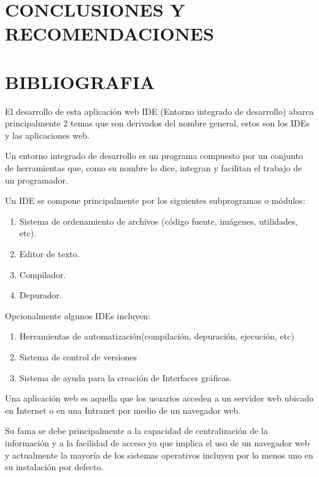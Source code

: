 \documentclass[12pt,letterpaper,oneside]{article}
\begin{document}
\section{CONCLUSIONES Y RECOMENDACIONES}

\section{BIBLIOGRAFIA}


El desarrollo de esta aplicación web IDE (Entorno integrado de
desarrollo) abarca principalmente 2 temas que son derivados del nombre
general, estos son los IDEs y las aplicaciones web.

Un entorno integrado de desarrollo es un programa
compuesto por un conjunto de herramientas que, como su nombre lo dice,
integran y facilitan el trabajo de un programador.

Un IDE se compone principalmente por los siguientes subprogramas o
módulos:

\begin{enumerate}
\item Sistema de ordenamiento de archivos (código fuente, imágenes, utilidades, etc).
\item Editor de texto.
\item Compilador.
\item Depurador.
\end{enumerate}

Opcionalmente algunos IDEs incluyen:


\begin{enumerate}
\item Herramientas de automatización(compilación, depuración, ejecución, etc)
\item Sistema de control de versiones
\item Sistema de ayuda para la creación de Interfaces gráficas.
\end{enumerate}



Una aplicación web es aquella que los usuarios acceden a un servidor
web ubicado en Internet o en una Intranet por medio de un navegador
web.


\bigskip

Su fama se debe principalmente a la capacidad de centralización de la
información y a la facilidad \textmd{\textup{de acceso ya que implica
el uso de un navegador web y actualmente la mayoría de los sistemas
operativos incluyen por lo menos uno en su instalación por defecto.}}
\end{document}
